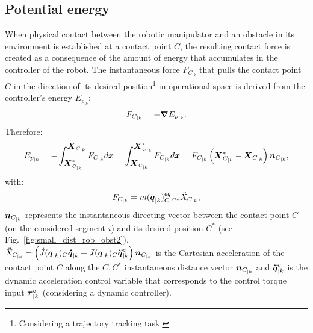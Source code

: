 \subsection{Potential energy}
When physical contact between the robotic manipulator and an obstacle in its environment is established at a contact point $C$, the resulting contact force is created as a consequence of the amount of energy that accumulates in the controller of the robot. The instantaneous force $F_{C_{|k}}$ that pulls the contact point $C$ in the direction of its desired position\footnote{Considering a trajectory tracking task.} in operational space is derived from the controller's energy $E_{p_{|k}}$:
\begin{equation}
F_{C_{|k}} = -\mbox{\boldmath${\nabla}$} E_{p_{|k}}.
\label{eq:F_drved_Ep}
\end{equation}
Therefore:
\begin{equation}
E_{p_{|k}} = -\int_{\mbox{\boldmath${X}$}_{C_{|k}}^{*}}^{\mbox{\boldmath${X}$}_{C_{|k}}} F_{C_{|k}} d\mbox{\boldmath${x}$} = \int_{\mbox{\boldmath${X}$}_{C_{|k}}}^{\mbox{\boldmath${X}$}_{C_{|k}}^{*}} F_{C_{|k}} d\mbox{\boldmath${x}$} = F_{C_{|k}} \left(\mbox{\boldmath${X}$}_{C_{|k}}^{*} - \mbox{\boldmath${X}$}_{C_{|k}}\right) \mbox{\boldmath${n}$}_{C_{|k}},
\label{eq:Ep_is_force_int}
\end{equation}
with:
\begin{equation}
\begin{split}
F_{C_{|k}} = m(\mbox{\boldmath${q}$}_{|k})_{C,C^*}^{eq} \ddot{X}_{C_{|k}},
\end{split}
\label{eq:expl_F_meq}
\end{equation}
$\mbox{\boldmath${n}$}_{C_{|k}}$ represents the instantaneous directing vector between the contact point $C$ (on the considered segment $i$) and its desired position $C^*$ (see Fig.~\ref{fig:small_dist_rob_obst2}). \\
$\ddot{X}_{C_{|k}} = \left(\dot{J}(\mbox{\boldmath${q}$}_{|k})_{C} \mbox{\boldmath${\dot{q}}$}_{|k} + J(\mbox{\boldmath${q}$}_{|k})_{C} \mbox{\boldmath${\ddot{q}}$}_{|k}^{c}\right) \mbox{\boldmath${n}$}_{C_{|k}}$ is the Cartesian acceleration of the contact point $C$ along the $C,C^*$ instantaneous distance vector $\mbox{\boldmath${n}$}_{C_{|k}}$ and $\mbox{\boldmath${\ddot{q}}$}_{|k}^{c}$ is the dynamic acceleration control variable that corresponds to the control torque input $\mbox{\boldmath${\tau}$}_{|k}^{c}$ (considering a dynamic controller). 

